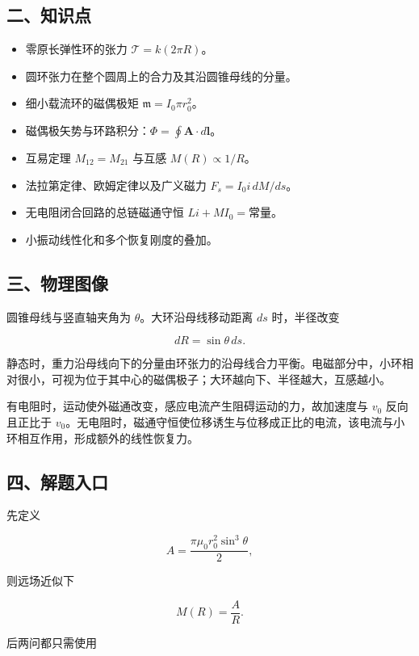 \documentclass[12pt,a4paper,UTF8]{ctexart}
\newcommand{\tightlist}{\setlength{\itemsep}{0pt}\setlength{\parskip}{0pt}}
\begin{document}
\subsection{二、知识点}\label{ux4e8cux77e5ux8bc6ux70b9-4}

\begin{itemize}
\tightlist
\item
  零原长弹性环的张力 \(\mathcal T=k(2\pi R)\)。
\item
  圆环张力在整个圆周上的合力及其沿圆锥母线的分量。
\item
  细小载流环的磁偶极矩 \(\mathfrak m=I_0\pi r_0^2\)。
\item
  磁偶极矢势与环路积分：\(\Phi=\oint\bm A\cdot d\bm l\)。
\item
  互易定理 \(M_{12}=M_{21}\) 与互感 \(M(R)\propto1/R\)。
\item
  法拉第定律、欧姆定律以及广义磁力 \(F_s=I_0i\,dM/ds\)。
\item
  无电阻闭合回路的总链磁通守恒 \(Li+MI_0=\text{常量}\)。
\item
  小振动线性化和多个恢复刚度的叠加。
\end{itemize}

\subsection{三、物理图像}\label{ux4e09ux7269ux7406ux56feux50cf-4}

圆锥母线与竖直轴夹角为 \(\theta\)。大环沿母线移动距离 \(ds\)
时，半径改变

\[dR=\sin\theta\,ds.\]

静态时，重力沿母线向下的分量由环张力的沿母线合力平衡。电磁部分中，小环相对很小，可视为位于其中心的磁偶极子；大环越向下、半径越大，互感越小。

有电阻时，运动使外磁通改变，感应电流产生阻碍运动的力，故加速度与 \(v_0\)
反向且正比于
\(v_0\)。无电阻时，磁通守恒使位移诱生与位移成正比的电流，该电流与小环相互作用，形成额外的线性恢复力。

\subsection{四、解题入口}\label{ux56dbux89e3ux9898ux5165ux53e3-4}

先定义

\[A=\frac{\pi\mu_0r_0^2\sin^3\theta}{2},\]

则远场近似下

\[M(R)=\frac AR.\]

后两问都只需使用
\end{document}

